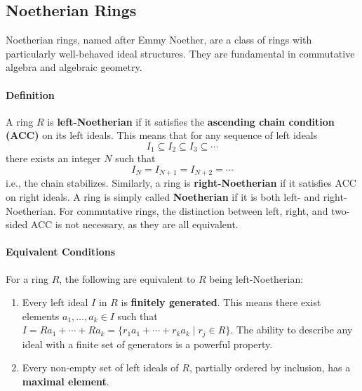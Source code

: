 \documentclass[12pt]{article}
\theoremstyle{definition}
\numberwithin{equation}{subsection}
\begin{document}
\subsection{Noetherian Rings}

Noetherian rings, named after Emmy Noether, are a class of rings with particularly well-behaved ideal structures. They are fundamental in commutative algebra and algebraic geometry.


\paragraph{Definition} 
A ring $R$ is \textbf{left-Noetherian} if it satisfies the \textbf{ascending chain condition (ACC)} on its left ideals. This means that for any sequence of left ideals
\[
I_1 \subseteq I_2 \subseteq I_3 \subseteq \cdots
\]
there exists an integer $N$ such that
\[
I_N = I_{N+1} = I_{N+2} = \cdots
\]
i.e., the chain stabilizes. Similarly, a ring is \textbf{right-Noetherian} if it satisfies ACC on right ideals. A ring is simply called \textbf{Noetherian} if it is both left- and right-Noetherian. For commutative rings, the distinction between left, right, and two-sided ACC is not necessary, as they are all equivalent.


\paragraph{Equivalent Conditions} 
For a ring $R$, the following are equivalent to $R$ being left-Noetherian:
\begin{enumerate}
\item Every left ideal $I$ in $R$ is \textbf{finitely generated}. This means there exist elements $a_1, \ldots, a_k \in I$ such that $I = Ra_1 + \cdots + Ra_k = \{r_1a_1 + \cdots + r_ka_k \mid r_j \in R\}$. The ability to describe any ideal with a finite set of generators is a powerful property.
\item Every non-empty set of left ideals of $R$, partially ordered by inclusion, has a \textbf{maximal element}.
\end{enumerate}
\end{document}
